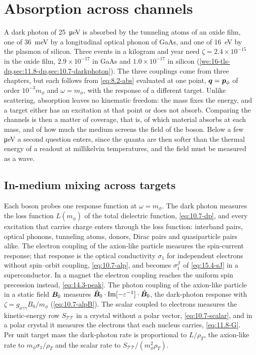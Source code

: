 \section{Absorption across channels}\label{sec:17.2}

A dark photon of \SI{25}{\micro eV} is absorbed by the tunneling atoms of an oxide film, one of \SI{36}{meV} by a longitudinal optical phonon of GaAs, and one of \SI{16}{eV} by the plasmon of silicon. Three events in a kilogram and year need $\zeta = 2.4\times10^{-15}$ in the oxide film, $2.9\times10^{-17}$ in GaAs and $1.0\times10^{-17}$ in silicon (\cref{we:16-tls-dp,sec:11.8-dp,sec:10.7-darkphoton}). The three couplings come from three chapters, but each follows from \cref{eq:8.2-abs} evaluated at one point, $\bm{q} = \bm{p}_\phi$ of order $10^{-3}m_\phi$ and $\omega = m_\phi$, with the response of a different target. Unlike scattering, absorption leaves no kinematic freedom: the mass fixes the energy, and a target either has an excitation at that point or does not absorb. Comparing the channels is then a matter of coverage, that is, of which material absorbs at each mass, and of how much the medium screens the field of the boson. Below a few \si{\micro eV} a second question enters, since the quanta are then softer than the thermal energy of a readout at millikelvin temperatures, and the field must be measured as a wave.

\subsection{In-medium mixing across targets}\label{sec:17.2-mixing}

Each boson probes one response function at $\omega = m_\phi$. The dark photon measures the loss function $L(m_\phi)$ of the total dielectric function, \cref{eq:10.7-dp}, and every excitation that carries charge enters through the loss function: interband pairs, optical phonons, tunneling atoms, donors, Dirac pairs and quasiparticle pairs alike. The electron coupling of the axion-like particle measures the spin-current response; that response is the optical conductivity $\sigma_1$ for independent electrons without spin--orbit coupling, \cref{eq:10.7-alp}, and becomes $\sigma_1^{\mathcal{J}}$ of \cref{eq:15.4-sJ} in a superconductor. In a magnet the electron coupling reaches the uniform spin precession instead, \cref{eq:14.3-peak}. The photon coupling of the axion-like particle in a static field $\bm{B}_0$ measures $\hat{\bm{B}}_0\cdot\operatorname{Im}[-\varepsilon^{-1}]\cdot\hat{\bm{B}}_0$, the dark-photon response with $\zeta = g_{a\gamma\gamma}B_0/m_\phi$ (\cref{eq:10.7-alpB}). The scalar coupled to electrons measures the kinetic-energy row $S_{\mathcal{T}\mathcal{T}}$ in a crystal without a polar vector, \cref{eq:10.7-scalar}, and in a polar crystal it measures the electrons that each nucleus carries, \cref{eq:11.8-G}. Per unit target mass the dark-photon rate is proportional to $L/\rho_T$, the axion-like rate to $m_\phi\sigma_1/\rho_T$ and the scalar rate to $S_{\mathcal{T}\mathcal{T}}/(m_\phi^2\rho_T)$.


